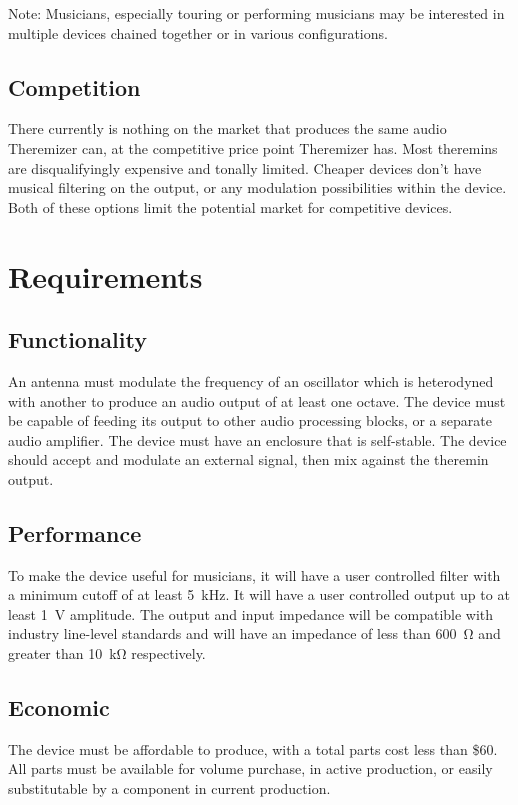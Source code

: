 \documentclass[a4paper,12pt]{article}
\begin{document}
	Note: Musicians, especially touring or performing musicians may be interested in multiple devices chained together or in various configurations.
	\subsection{Competition}
	There currently is nothing on the market that produces the same audio Theremizer can, at the competitive price point Theremizer has. Most theremins are disqualifyingly expensive and tonally limited. Cheaper devices don't have musical filtering on the output, or any modulation possibilities within the device. Both of these options limit the potential market for competitive devices. 
	
	\section{Requirements}
	\subsection{Functionality}
	An antenna must modulate the frequency of an oscillator which is heterodyned with another to produce an audio output of at least one octave. The device must be capable of feeding its output to other audio processing blocks, or a separate audio amplifier. The device must have an enclosure that is self-stable. The device should accept and modulate an external signal, then mix against the theremin output.
	\subsection{Performance}
		To make the device useful for musicians, it will have a user controlled filter with a minimum cutoff of at least \SI{5}{\kilo\hertz}. It will have a user controlled output up to at least \SI{1}{\volt} amplitude. The output and input impedance will be compatible with industry line-level standards and will have an impedance of less than \SI{600}{\ohm} and greater than \SI{10}{\kilo\ohm} respectively. 
	\subsection{Economic}
	The device must be affordable to produce, with a total parts cost less than \$60. All parts must be available for volume purchase, in active production, or easily substitutable by a component in current production. 
\end{document}
